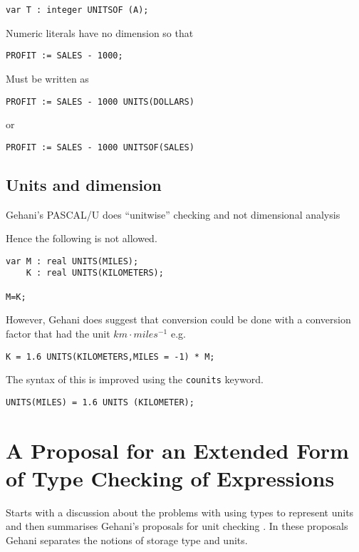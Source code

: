 \documentclass[a4paper]{article}
\begin{document}
\begin{verbatim}
var T : integer UNITSOF (A);
\end{verbatim}

Numeric literals have no dimension so that 
\begin{verbatim}
PROFIT := SALES - 1000;
\end{verbatim}
Must be written as
\begin{verbatim}
PROFIT := SALES - 1000 UNITS(DOLLARS)
\end{verbatim}
or
\begin{verbatim}
PROFIT := SALES - 1000 UNITSOF(SALES)
\end{verbatim}

\subsection{Units and dimension}
Gehani's PASCAL/U does ``unitwise'' checking and not dimensional analysis

Hence the following is not allowed.
\begin{verbatim}
var M : real UNITS(MILES);
    K : real UNITS(KILOMETERS);

M=K;
\end{verbatim}

However, Gehani does suggest that conversion could be done with a conversion
factor that had the unit $km\cdot miles^{-1}$ e.g.
\begin{verbatim}
K = 1.6 UNITS(KILOMETERS,MILES = -1) * M;
\end{verbatim}

The syntax of this is improved using the \texttt{counits} keyword.

\begin{verbatim}
UNITS(MILES) = 1.6 UNITS (KILOMETER);
\end{verbatim}







\section{A Proposal for an Extended Form of Type Checking of Expressions 
\cite{ME_house}}

Starts with a discussion about the problems with using types to represent 
units and then summarises Gehani's proposals for unit checking 
\cite{ME_gehani}. In these 
proposals Gehani separates the notions of storage type and units.
\end{document}
